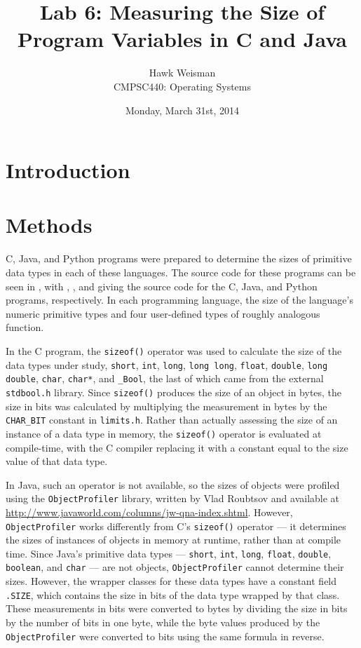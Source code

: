 \documentclass[12pt,letterpaper]{article}
\author{Hawk Weisman\\CMPSC440: Operating Systems}
\title{Lab 6: Measuring the Size of Program Variables in C and Java}
\date{Monday, March 31st, 2014}
\begin{document}
	\maketitle
	\section {Introduction}
	\section {Methods}
		
		C, Java, and Python programs were prepared to determine the sizes of primitive data types in each of these languages. The source code for these programs can be seen in , with , , and  giving the source code for the C, Java, and Python programs, respectively. In each programming language, the size of the language's numeric primitive types and four user-defined types of roughly analogous function.

		In the C program, the \texttt{sizeof()} operator was used to calculate the size of the data types under study, \texttt{short}, \texttt{int}, \texttt{long}, \texttt{long long}, \texttt{float}, \texttt{double}, \texttt{long double}, \texttt{char}, \texttt{char*}, and \texttt{\_Bool}, the last of which came from the external \texttt{stdbool.h} library. Since \texttt{sizeof()} produces the size of an object in bytes, the size in bits was calculated by multiplying the measurement in bytes by the \texttt{CHAR\_BIT} constant in \texttt{limits.h}. Rather than actually assessing the size of an instance of a data type in memory, the \texttt{sizeof()} operator is evaluated at compile-time, with the C compiler replacing it with a constant equal to the size value of that data type. 

		In Java, such an operator is not available, so the sizes of objects were profiled using the \texttt{ObjectProfiler} library, written by Vlad Roubtsov and available at \url{http://www.javaworld.com/columns/jw-qna-index.shtml}. However, \texttt{ObjectProfiler} works differently from C's \texttt{sizeof()} operator --- it determines  the sizes of instances of objects in memory at runtime, rather than at compile time. Since Java's primitive data types --- \texttt{short}, \texttt{int}, \texttt{long}, \texttt{float}, \texttt{double}, \texttt{boolean}, and \texttt{char} --- are not objects, \texttt{ObjectProfiler} cannot determine their sizes. However, the wrapper classes for these data types have a constant field \texttt{.SIZE}, which contains the size in bits of the data type wrapped by that class. These measurements in bits were converted to bytes by dividing the size in bits by the number of bits in one byte, while the byte values produced by the \texttt{ObjectProfiler} were converted to bits using the same formula in reverse.
\end{document}
